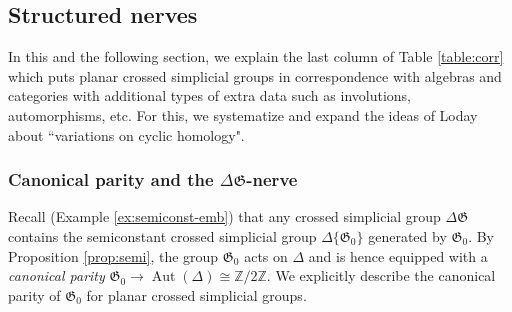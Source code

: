 \documentclass[english,11pt,leqno]{article}
\def\Gen{\mathfrak{G}}
\def\Aut{\operatorname{Aut}\nolimits}
\def\Zt{\mathbb{Z}/2\mathbb{Z}}
\def\DG{ {\Delta \Gen}}
\theoremstyle{definition}
\theoremstyle{remark}
\newtheorem{rem}[thm]{Remark}
\numberwithin{equation}{section}
\begin{document}
   
   
   
   
\subsection{Structured nerves }\label{subsec:str-nerv}

In this  and the following section, we explain the last column of Table \ref{table:corr} which puts planar crossed
simplicial groups in correspondence with algebras and categories with additional types of extra data
such as involutions, automorphisms, etc.  For this, we systematize and expand the ideas of
Loday \cite[Ch. 5]{loday} about ``variations on cyclic homology".

\subsubsection{Canonical parity and the $\DG$-nerve}
Recall (Example \ref{ex:semiconst-emb}) that 
 any crossed simplicial group $\DG$ contains the semiconstant crossed simplicial group $\Delta
\{\Gen_0\}$ generated by $\Gen_0$. By Proposition \ref{prop:semi}, the group $\Gen_0$ acts on $\Delta$ and is
hence equipped with a {\em canonical parity} $\Gen_0 \to \Aut(\Delta) \cong \Zt$.  We explicitly
describe the canonical parity of $\Gen_0$ for planar crossed simplicial groups.
\end{document}
